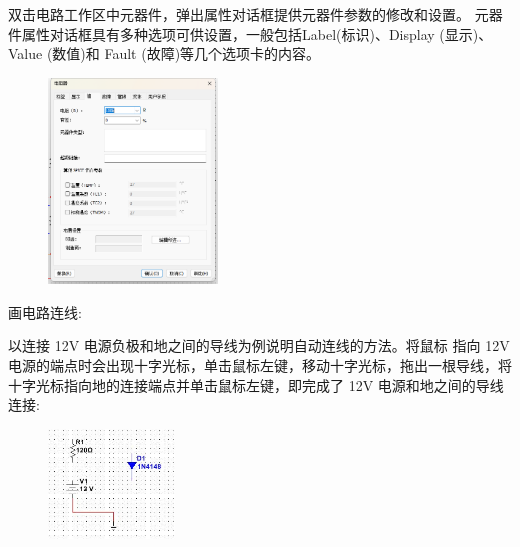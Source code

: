 \documentclass[a4paper,11pt,UTF8]{article}
\numberwithin{equation}{subsection}
\begin{document}
双击电路工作区中元器件，弹出属性对话框提供元器件参数的修改和设置。
元器件属性对话框具有多种选项可供设置，一般包括Label(标识)、Display (显示)、Value (数值)和 Fault (故障)等几个选项卡的内容。
\begin{figure}[H]
	\centering
	\includegraphics[width=0.4\textwidth]{5.2.2_2}	
\end{figure}

画电路连线:

以连接 12V 电源负极和地之间的导线为例说明自动连线的方法。将鼠标
指向 12V 电源的端点时会出现十字光标，单击鼠标左键，移动十字光标，拖出一根导线，将十字光标指向地的连接端点并单击鼠标左键，即完成了 12V 电源和地之间的导线连接:
\begin{figure}[H]
	\centering
	\includegraphics[width=0.3\textwidth]{5.2.2_3}	
\end{figure}
\end{document}
